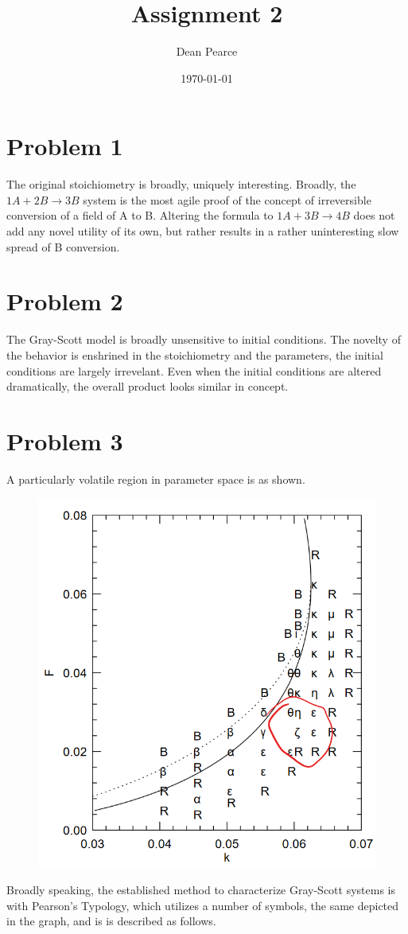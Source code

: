 \documentclass[titlepage]{scrartcl}
\title{Assignment 2}
\date{\today}
\author{Dean Pearce}
\begin{document}
\maketitle
\section{Problem 1}
The original stoichiometry is broadly, uniquely interesting.  Broadly, the $1A+2B \rightarrow 3B$ system is the most agile proof of the concept of irreversible conversion of a field of A to B.  Altering the formula to $1A+3B \rightarrow 4B$ does not add any novel utility of its own, but rather results in a rather uninteresting slow spread of B conversion.
\section{Problem 2}
The Gray-Scott model is broadly unsensitive to initial conditions.  The novelty of the behavior is enshrined in the stoichiometry and the parameters, the initial conditions are largely irrevelant.  Even when the initial conditions are altered dramatically, the overall product looks similar in concept.
\section{Problem 3}
A particularly volatile region in parameter space is as shown.
\begin{figure}[H]
    \centering
    \includegraphics[scale=0.5]{graph.png}
\end{figure}
Broadly speaking, the established method to characterize Gray-Scott systems is with Pearson's Typology\cite{pearsonComplexPatternsSimple1993}, which utilizes a number of symbols, the same depicted in the graph, and is  is described as follows.
\end{document}
